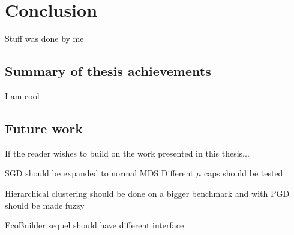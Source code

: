 \chapter{Conclusion}
\label{chap:conclusion}

Stuff was done by me

\section{Summary of thesis achievements}

I am cool

\section{Future work}
If the reader wishes to build on the work presented in this thesis...

SGD should be expanded to normal MDS
Different $\mu$ caps should be tested

Hierarchical clustering should be done on a bigger benchmark and with
PGD should be made fuzzy

EcoBuilder sequel should have different interface
